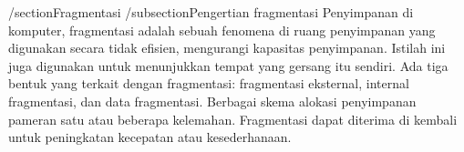 /section{Fragmentasi}
/subsection{Pengertian fragmentasi}	
	Penyimpanan di komputer, fragmentasi adalah sebuah fenomena di ruang penyimpanan yang digunakan secara tidak efisien, mengurangi kapasitas penyimpanan. Istilah ini juga digunakan untuk menunjukkan tempat yang gersang itu sendiri.
	Ada tiga bentuk yang terkait dengan fragmentasi: fragmentasi eksternal, internal fragmentasi, dan data fragmentasi. Berbagai skema alokasi penyimpanan pameran satu atau beberapa kelemahan. Fragmentasi dapat diterima di kembali untuk peningkatan kecepatan atau kesederhanaan.

